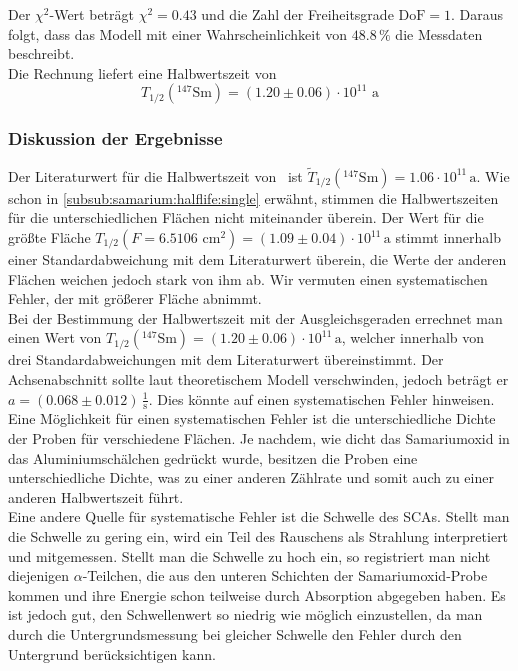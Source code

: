Der $\chi^2$-Wert beträgt $\chi^2 =0.43$ und die Zahl der Freiheitsgrade $\text{DoF} = 1$. Daraus folgt, dass das Modell mit einer 
Wahrscheinlichkeit von $48.8\,\%$ die Messdaten beschreibt. \\
Die Rechnung liefert eine Halbwertszeit von
\begin{equation}
  T_{1/2}({}^{147}\text{Sm}) = (1.20 \pm 0.06) \cdot 10^{11} \text{ a}
\end{equation}

\subsubsection{Diskussion der Ergebnisse}
\label{subsub:samarium:discussion}
Der Literaturwert für die Halbwertszeit von \samarium\, ist $\tilde{T}_{1/2}({}^{147}\text{Sm}) = 1.06 \cdot 10^{11}\,\text{a}$.
Wie schon in \ref{subsub:samarium:halflife:single} erwähnt, stimmen die Halbwertszeiten für die unterschiedlichen Flächen nicht miteinander 
überein. Der Wert für die größte Fläche $T_{1/2}(F=6.5106 \text{ cm}^2) = (1.09 \pm 0.04)\cdot 10^{11}\,\text{a}$ stimmt innerhalb einer 
Standardabweichung mit dem Literaturwert überein, die Werte der anderen Flächen weichen jedoch stark von ihm ab. Wir vermuten einen systematischen 
Fehler, der mit größerer Fläche abnimmt.\\
Bei der Bestimmung der Halbwertszeit mit der Ausgleichsgeraden errechnet man einen Wert von 
$T_{1/2}({}^{147}\text{Sm}) = (1.20 \pm 0.06) \cdot 10^{11}\,\text{a}$, welcher innerhalb von drei Standardabweichungen mit dem Literaturwert 
übereinstimmt. Der Achsenabschnitt sollte laut theoretischem Modell verschwinden, jedoch beträgt er $a = (0.068  \pm 0.012 )\,\frac{1}{\text{s}}$.
Dies könnte auf einen systematischen Fehler hinweisen. \\
Eine Möglichkeit für einen systematischen Fehler ist die unterschiedliche Dichte der Proben für verschiedene Flächen. Je nachdem, wie dicht 
das Samariumoxid in das Aluminiumschälchen gedrückt wurde, besitzen die Proben eine unterschiedliche Dichte, was zu einer anderen Zählrate und 
somit auch zu einer anderen Halbwertszeit führt. \\
Eine andere Quelle für systematische Fehler ist die Schwelle des SCAs. Stellt man die Schwelle zu 
gering ein, wird ein Teil des Rauschens als Strahlung interpretiert und mitgemessen. Stellt man die Schwelle zu hoch ein, so registriert man 
nicht diejenigen $\alpha$-Teilchen, die aus den unteren Schichten der Samariumoxid-Probe kommen und ihre Energie schon teilweise durch Absorption 
abgegeben haben. Es ist jedoch gut, den Schwellenwert so niedrig wie möglich einzustellen, da man durch die Untergrundsmessung bei gleicher 
Schwelle den Fehler durch den Untergrund berücksichtigen kann.

